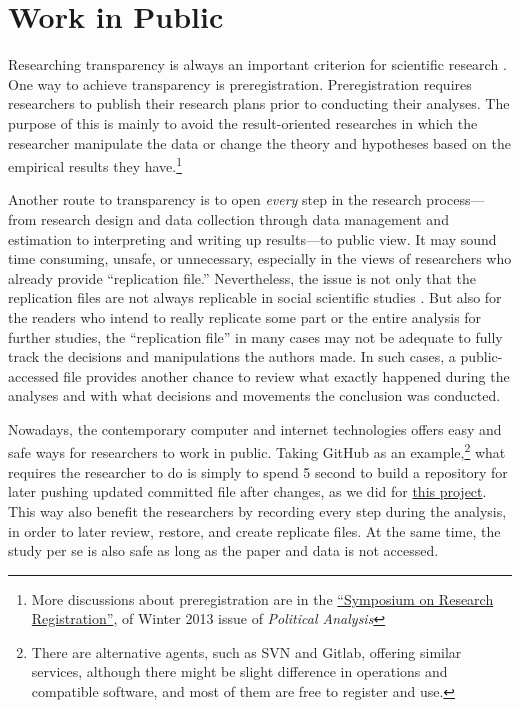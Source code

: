 
\section{Work in Public}

Researching transparency is always an important criterion for scientific research \citep{Appadurai2000, Denzin2009}. One way to achieve transparency is preregistration. Preregistration requires researchers to publish their research plans prior to conducting their analyses. The purpose of this is mainly to avoid the result-oriented researches in which the researcher manipulate the data or change the theory and hypotheses based on the empirical results they have.\footnote{More discussions about preregistration are in the \href{http://pan.oxfordjournals.org/content/21/1.toc}{``Symposium on Research Registration''}, of Winter 2013 issue of \textit{Political Analysis}}

Another route to transparency is to open \emph{every} step in the research process--- from research design and data collection through data management and estimation to interpreting and writing up results---to public view. It may sound time consuming, unsafe, or unnecessary, especially in the views of researchers who already provide ``replication file.'' Nevertheless, the issue is not only that the replication files are not always replicable in social scientific studies \citep{Chang2015,Jacoby2015,OpenScienceCollaboration2015}. But also for the readers who intend to really replicate some part or the entire analysis for further studies, the ``replication file'' in many cases may not be adequate to fully track the decisions and manipulations the authors made. In such cases, a public-accessed file provides another chance to review what exactly happened during the analyses and with what decisions and movements the conclusion was conducted. 

Nowadays, the contemporary computer and internet technologies offers easy and safe ways for researchers to work in public. Taking GitHub as an example,\footnote{There are alternative agents, such as SVN and Gitlab, offering similar services, although there might be slight difference in operations and compatible software, and most of them are free to register and use.} what requires the researcher to do is simply to spend 5 second to build a repository for later pushing updated committed file after changes, as we did for \href{https://github.com/fsolt/meritocracy-rep}{this project}. This way also benefit the researchers by recording every step during the analysis, in order to later review, restore, and create replicate files. At the same time, the study per se is also safe as long as the paper and data is not accessed. 




